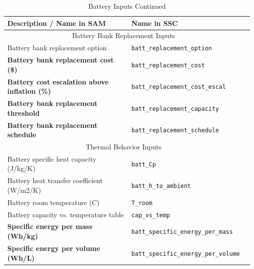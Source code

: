\documentclass[12pt,letterpaper]{article}
\begin{document}
\begin{table}
\begin{center}
\caption{Battery Inputs Continued}
\begin{tabular}{lll}
\midrule
Description / \textbf{Name in SAM} & Name in SSC \\
\midrule
\multicolumn{2}{c}{Battery Bank Replacement Inputs}\\
Battery bank replacement option & \texttt{batt\_replacement\_option} \\
\textbf{Battery bank replacement cost (\$)} & \texttt{batt\_replacement\_cost} \\
\textbf{Battery cost escalation above inflation (\%)} & \texttt{batt\_replacement\_cost\_escal} \\
\textbf{Battery bank replacement threshold} & \texttt{batt\_replacement\_capacity} \\
\textbf{Battery bank replacement schedule} & \texttt{batt\_replacement\_schedule} \\

\midrule
\multicolumn{2}{c}{Thermal Behavior Inputs}\\
Battery specific heat capacity (J/kg/K) & \texttt{batt\_Cp} \\
Battery heat transfer coefficient (W/m2/K)& \texttt{batt\_h\_to\_ambient} \\
Battery room temperature (C) & \texttt{T\_room} \\
Battery capacity vs. temperature table & \texttt{cap\_vs\_temp} \\
\textbf{Specific energy per mass (Wh/kg)} & \texttt{batt\_specific\_energy\_per\_mass} \\
\textbf{Specific energy per volume (Wh/L)} & \texttt{batt\_specific\_energy\_per\_volume} \\
\hline
\end{tabular}
\label{tab-batteryinputs2}
\end{center}
\end{table}
\end{document}
